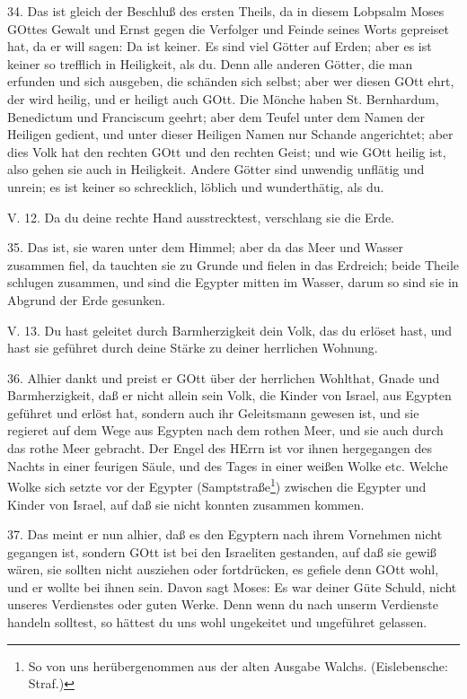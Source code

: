 34. Das ist gleich der Beschluß des ersten Theils, da in diesem Lobpsalm Moses GOttes Gewalt und Ernst gegen die Verfolger und Feinde seines Worts gepreiset hat, da er will sagen: Da ist keiner. Es sind viel Götter auf Erden; aber es ist keiner so trefflich in Heiligkeit, als du. Denn alle anderen Götter, die man erfunden und sich ausgeben, die schänden sich selbst; aber wer diesen GOtt ehrt, der wird heilig, und er heiligt auch GOtt. Die Mönche haben St. Bernhardum, Benedictum und Franciscum geehrt; aber dem Teufel unter dem Namen der Heiligen gedient, und unter dieser Heiligen Namen nur Schande angerichtet; aber dies Volk hat den rechten GOtt und den rechten Geist; und wie GOtt heilig ist, also gehen sie auch in Heiligkeit. Andere Götter sind unwendig unflätig und unrein; es ist keiner so schrecklich, löblich und wunderthätig, als du.

\begin{schriftzitat}
V. 12. Da du deine rechte Hand ausstrecktest, verschlang sie die Erde.
\end{schriftzitat}

35. Das ist, sie waren unter dem Himmel; aber da das Meer und Wasser zusammen fiel, da tauchten sie zu Grunde und fielen in das Erdreich; beide Theile schlugen zusammen, und sind die Egypter mitten im Wasser, darum so sind sie in Abgrund der Erde gesunken.

\begin{schriftzitat}
V. 13. Du hast geleitet durch Barmherzigkeit dein Volk, das du erlöset hast, und hast sie geführet durch deine Stärke zu deiner herrlichen Wohnung.
\end{schriftzitat}

36. Alhier dankt und preist er GOtt über der herrlichen Wohlthat, Gnade und Barmherzigkeit, daß er nicht allein sein Volk, die Kinder von Israel, aus Egypten geführet und erlöst hat, sondern auch ihr Geleitsmann gewesen ist, und sie regieret auf dem Wege aus Egypten nach dem rothen Meer, und sie auch durch das rothe Meer gebracht. Der Engel des HErrn ist vor ihnen hergegangen des Nachts in einer feurigen Säule, und des Tages in einer weißen Wolke etc. Welche Wolke sich setzte vor der Egypter (Samptstraße\footnote{So von uns herübergenommen aus der alten Ausgabe Walchs. (Eislebensche: Straf.)}) zwischen die Egypter und Kinder von Israel, auf daß sie nicht konnten zusammen kommen.

37. Das meint er nun alhier, daß es den Egyptern nach ihrem Vornehmen nicht gegangen ist, sondern GOtt ist bei den Israeliten gestanden, auf daß sie gewiß wären, sie sollten nicht ausziehen oder fortdrücken, es gefiele denn GOtt wohl, und er wollte bei ihnen sein. Davon sagt Moses: Es war deiner Güte Schuld, nicht unseres Verdienstes oder guten Werke. Denn wenn du nach unserm Verdienste handeln solltest, so hättest du uns wohl ungekeitet und ungeführet gelassen.

